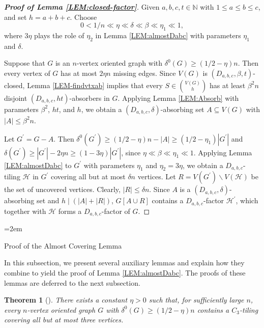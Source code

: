\documentclass[11pt,a4paper,reqno]{amsart}
\makeatletter
\renewcommand\subsection{\@startsection{subsection}{2}%
  \z@{-1\linespacing\@plus-.7\linespacing}{1\linespacing}%
  {\normalfont\large\bfseries\raggedright\hangindent=2em  \hangafter=1}}
\newtheorem{theorem}{Theorem}[section]
\theoremstyle{definition} %
\makeatother
\begin{document}
\begin{proof}[\textbf{Proof of Lemma \ref{LEM:closed-factor}}]
Given $a,b,c,t\in \mathbb{N}$ with $1\leqslant a\leqslant b \leqslant c$, and set $h=a+b+c$. Choose
$$0<1/n\ll\eta\ll \delta\ll\beta\ll\eta_1\ll1,$$
where $3\eta$ plays the role of $\eta_2$ in Lemma \ref{LEM:almostDabc} with parameters $\eta_1$ and $\delta$.

Suppose that $G$ is an $n$-vertex oriented graph with $\delta^{0}(G)\geqslant (1/2-\eta)n$. Then every vertex of $G$ has at most $2\eta n$ missing edges. Since $V(G)$ is $(D_{a,b,c}, \beta, t)$-closed, Lemma \ref{LEM-findvtxab} implies that every $S\in \binom{V(G)}{h}$ has at least $\beta^2 n$ disjoint $(D_{a,b,c}, ht)$-absorbers in $G$. Applying Lemma \ref{LEM:Absorb} with parameters $\beta^2$, $ht$, and $h$, we obtain a $(D_{a,b,c}, \delta)$-absorbing set $A \subseteq V(G)$ with $|A| \leqslant \beta^2 n$.

Let $G^{\prime}=G-A$. Then
$\delta^0(G^{\prime}) \geqslant(1/2-\eta)n-|A|\geqslant(1/2-\eta_1)|G^\prime|$
and
$\delta(G^{\prime})\geqslant |G^{\prime}|-2\eta n\geqslant (1-3\eta)|G^{\prime}|$,
since $\eta\ll\beta\ll\eta_1\ll 1$.
Applying Lemma \ref{LEM:almostDabc} to $G^{\prime}$ with parameters $\eta_1$ and $\eta_2=3\eta$, we obtain a $D_{a,b,c}$-tiling $\mathcal{H}$ in $G^{\prime}$ covering all but at most $\delta n$ vertices.
Let $R=V(G^{\prime}) \backslash V(\mathcal{H})$ be the set of uncovered vertices. Clearly, $|R|\leqslant \delta n$.
Since $A$ is a $(D_{a,b,c}, \delta)$-absorbing set and $h \mid (|A|+|R|)$, $G[A \cup R]$ contains a $D_{a,b,c}$-factor $\mathcal{H}^\prime$, which together with $\mathcal{H}$ forms a $D_{a,b,c}$-factor of $G$.
\end{proof}


\subsection{Proof of the Almost Covering Lemma}

In this subsection, we present several auxiliary lemmas and explain how they combine to yield the proof of Lemma \ref{LEM:almostDabc}. The proofs of these lemmas are deferred to the next subsection.

\begin{theorem}[\cite{keevashJCTB99}]\label{THM:trianglefactor}
There exists a constant $\eta>0$ such that, for sufficiently large $n$, every $n$-vertex oriented graph $G$ with $\delta^0(G)\geqslant (1/2-\eta)n$ contains a $C_3$-tiling covering all but at most three vertices.
\end{theorem}
\end{document}
